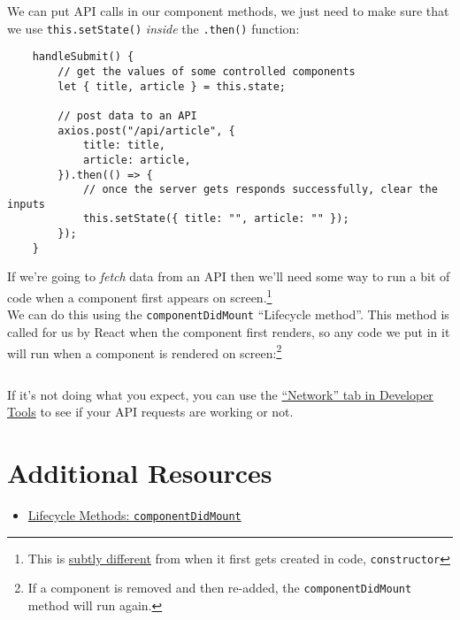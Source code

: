 We can put API calls in our component methods, we just need to make sure that we use \texttt{this.setState()} \textit{inside} the \texttt{.then()} function:

\begin{verbatim}
    handleSubmit() {
        // get the values of some controlled components
        let { title, article } = this.state;

        // post data to an API
        axios.post("/api/article", {
            title: title,
            article: article,
        }).then(() => {
            // once the server gets responds successfully, clear the inputs
            this.setState({ title: "", article: "" });
        });
    }
\end{verbatim}

If we're going to \textit{fetch} data from an API then we'll need some way to run a bit of code when a component first appears on screen.\footnote{This is \href{https://medium.com/@mahcloud/actions-in-the-constructor-or-componentdidmount-be3720e4a9a6}{subtly different} from when it first gets created in code, \texttt{constructor}}
\\

We can do this using the \texttt{componentDidMount} ``Lifecycle method''. This method is called for us by React when the component first renders, so any code we put in it will run when a component is rendered on screen:\footnote{If a component is removed and then re-added, the \texttt{componentDidMount} method will run again.}

\inputminted{js}{01/figures/01-StarWarsFolks.jsx}

If it's not doing what you expect, you can use the \href{https://developer.mozilla.org/en-US/docs/Tools/Network_Monitor}{``Network'' tab in Developer Tools} to see if your API requests are working or not.



\section{Additional Resources}

\begin{itemize}[leftmargin=*]
    \item \href{https://reactjs.org/docs/react-component.html#componentdidmount}{Lifecycle Methods: \texttt{componentDidMount}}
\end{itemize}
